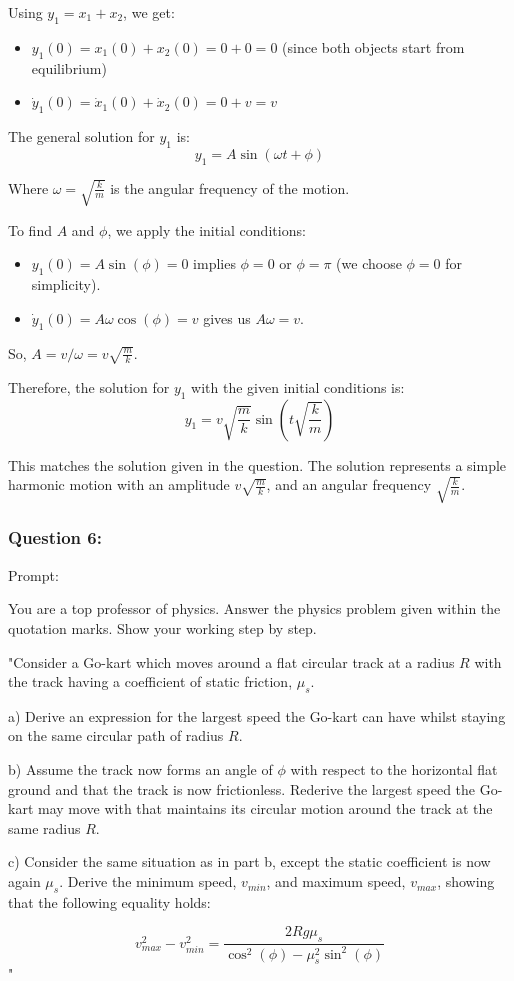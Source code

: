 \documentclass[a4paper,11pt]{article}
\begin{document}
Using \( y_1 = x_1 + x_2 \), we get:
\begin{itemize}
  \item \( y_1(0) = x_1(0) + x_2(0) = 0 + 0 = 0 \) (since both objects start from equilibrium)
  \item \( \dot{y}_1(0) = \dot{x}_1(0) + \dot{x}_2(0) = 0 + v = v \)
\end{itemize}

The general solution for \( y_1 \) is:
\[ y_1 = A \sin(\omega t + \phi) \]

Where \( \omega = \sqrt{\frac{k}{m}} \) is the angular frequency of the motion.

To find \( A \) and \( \phi \), we apply the initial conditions:
\begin{itemize}
  \item \( y_1(0) = A \sin(\phi) = 0 \) implies \( \phi = 0 \) or \( \phi = \pi \) (we choose \( \phi = 0 \) for simplicity).
  \item \( \dot{y}_1(0) = A \omega \cos(\phi) = v \) gives us \( A \omega = v \).
\end{itemize}

So, \( A = v / \omega = v \sqrt{\frac{m}{k}} \).

Therefore, the solution for \( y_1 \) with the given initial conditions is:
\[ y_1 = v \sqrt{\frac{m}{k}} \sin(t \sqrt{\frac{k}{m}}) \]

This matches the solution given in the question. The solution represents a simple harmonic motion with an amplitude \( v \sqrt{\frac{m}{k}} \), and an angular frequency \( \sqrt{\frac{k}{m}} \).

\subsubsection*{Question 6:}

Prompt:
\begin{spverbatim}
    You are a top professor of physics. Answer the physics problem given within the quotation marks. Show your working step by step.

    "Consider a Go-kart which moves around a flat circular track at a radius \( R \) with the track having a coefficient of static friction, \( \mu_{s} \). 

    a) Derive an expression for the largest speed the Go-kart can have whilst staying on the same circular path of radius \( R \). 
    
    b) Assume the track now forms an angle of \( \phi \) with respect to the horizontal flat ground and that the track is now frictionless. Rederive the largest speed the Go-kart may move with that maintains its circular motion around the track at the same radius \( R \). 
    
    c) Consider the same situation as in part b, except the static coefficient is now again \( \mu_{s} \). Derive the minimum speed, \( v_{min} \), and maximum speed, \( v_{max} \), showing that the following equality holds:
    
    \[ 
    v_{max}^{2} - v_{min}^{2} = \frac{2Rg\mu_{s}}{\cos^{2}(\phi) - \mu_{s}^{2}\sin^{2}(\phi)}
    \]"
\end{spverbatim}
\end{document}
